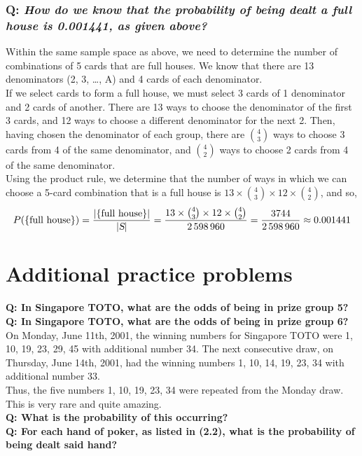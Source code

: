 \documentclass{article}
\begin{document}
\subsubsection*{Q: {\em How do we know that the probability of being dealt a full house is 0.001441, as given above?}}
Within the same sample space as above, we need to determine the number of combinations of 5 cards that are full houses. We know that there are 13 denominators (2, 3, \ldots, A) and 4 cards of each denominator.\\[1ex]
If we select cards to form a full house, we must select 3 cards of 1 denominator and 2 cards of another. There are 13 ways to choose the denominator of the first 3 cards, and 12 ways to choose a different denominator for the next 2. Then, having chosen the denominator of each group, there are $\binom{4}{3}$ ways to choose 3 cards from 4 of the same denominator, and $\binom{4}{2}$ ways to choose 2 cards from 4 of the same denominator.\\[1ex]
Using the product rule, we determine that the number of ways in which we can choose a 5-card combination that is a full house is $13\times\binom{4}{3}\times 12\times\binom{4}{2}$, and so,
\begin{equation*}
P(\{\text{full house}\})=\dfrac{|\{\text{full house}\}|}{|\textsl{S}|}=\dfrac{13\times\binom{4}{3}\times 12\times\binom{4}{2}}{2\,598\,960}=\dfrac{3744}{2\,598\,960}\approx 0.001441
\end{equation*}

\section{\sc Additional practice problems}

{\bf Q: In Singapore TOTO, what are the odds of being in prize group 5?}\\[1em]
{\bf Q: In Singapore TOTO, what are the odds of being in prize group 6?}\\[1em]
On Monday, June 11th, 2001, the winning numbers for Singapore TOTO were 1, 10, 19, 23, 29, 45 with additional number 34. The next consecutive draw, on Thursday, June 14th, 2001, had the winning numbers 1, 10, 14, 19, 23, 34 with additional number 33.\\[1ex]
Thus, the five numbers 1, 10, 19, 23, 34 were repeated from the Monday draw. This is very rare and quite amazing.\\[1ex]
{\bf Q: What is the probability of this occurring?}\\[1em]
{\bf Q: For each hand of poker, as listed in (2.2), what is the probability of being dealt said hand?}
\end{document}
